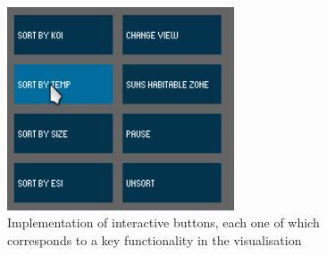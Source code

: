 \begin{figure}[H]
  \centering
      \includegraphics[width=0.6\textwidth]{images/buttons.jpg}
  \caption[Implementation of interactive buttons]{Implementation of interactive
buttons, each one of which corresponds to a key functionality in the
visualisation}
  \label{fig:buttons}
\end{figure}

